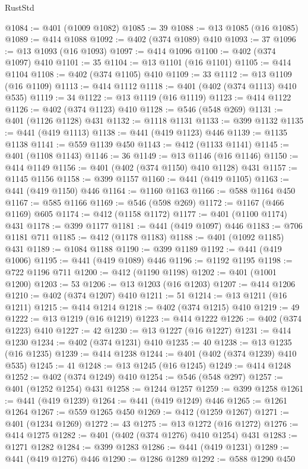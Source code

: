 \begin{lexlean}{RustStd}
\begin{coremodule}
@1084 := @401 (@1009 @1082)
@1085 := 39
@1088 := @13 @1085 (@16 @1085)
@1089 := @414 @1088
@1092 := @402 (@374 @1089) @410
@1093 := 37
@1096 := @13 @1093 (@16 @1093)
@1097 := @414 @1096
@1100 := @402 (@374 @1097) @410
@1101 := 35
@1104 := @13 @1101 (@16 @1101)
@1105 := @414 @1104
@1108 := @402 (@374 @1105) @410
@1109 := 33
@1112 := @13 @1109 (@16 @1109)
@1113 := @414 @1112
@1118 := @401 (@402 (@374 @1113) @410 @535)
@1119 := 34
@1122 := @13 @1119 (@16 @1119)
@1123 := @414 @1122
@1126 := @402 (@374 @1123) @410
@1128 := @546 (@548 @269)
@1131 := @401 (@1126 @1128) @431
@1132 := @1118 @1131
@1133 := @399 @1132
@1135 := @441 (@419 @1113)
@1138 := @441 (@419 @1123) @446
@1139 := @1135 @1138
@1141 := @559 @1139 @450
@1143 := @412 (@1133 @1141)
@1145 := @401 (@1108 @1143)
@1146 := 36
@1149 := @13 @1146 (@16 @1146)
@1150 := @414 @1149
@1156 := @401 (@402 (@374 @1150) @410 @1128) @431
@1157 := @1145 @1156
@1158 := @399 @1157
@1160 := @441 (@419 @1105)
@1163 := @441 (@419 @1150) @446
@1164 := @1160 @1163
@1166 := @588 @1164 @450
@1167 := @585 @1166
@1169 := @546 (@598 @269)
@1172 := @1167 (@466 @1169) @605
@1174 := @412 (@1158 @1172)
@1177 := @401 (@1100 @1174) @431
@1178 := @399 @1177
@1181 := @441 (@419 @1097) @446
@1183 := @706 @1181 @711
@1185 := @412 (@1178 @1183)
@1188 := @401 (@1092 @1185) @431
@1189 := @1084 @1188
@1190 := @399 @1189
@1192 := @441 (@419 @1006)
@1195 := @441 (@419 @1089) @446
@1196 := @1192 @1195
@1198 := @722 @1196 @711
@1200 := @412 (@1190 @1198)
@1202 := @401 (@1001 @1200)
@1203 := 53
@1206 := @13 @1203 (@16 @1203)
@1207 := @414 @1206
@1210 := @402 (@374 @1207) @410
@1211 := 51
@1214 := @13 @1211 (@16 @1211)
@1215 := @414 @1214
@1218 := @402 (@374 @1215) @410
@1219 := 49
@1222 := @13 @1219 (@16 @1219)
@1223 := @414 @1222
@1226 := @402 (@374 @1223) @410
@1227 := 42
@1230 := @13 @1227 (@16 @1227)
@1231 := @414 @1230
@1234 := @402 (@374 @1231) @410
@1235 := 40
@1238 := @13 @1235 (@16 @1235)
@1239 := @414 @1238
@1244 := @401 (@402 (@374 @1239) @410 @535)
@1245 := 41
@1248 := @13 @1245 (@16 @1245)
@1249 := @414 @1248
@1252 := @402 (@374 @1249) @410
@1254 := @546 (@548 @297)
@1257 := @401 (@1252 @1254) @431
@1258 := @1244 @1257
@1259 := @399 @1258
@1261 := @441 (@419 @1239)
@1264 := @441 (@419 @1249) @446
@1265 := @1261 @1264
@1267 := @559 @1265 @450
@1269 := @412 (@1259 @1267)
@1271 := @401 (@1234 @1269)
@1272 := 43
@1275 := @13 @1272 (@16 @1272)
@1276 := @414 @1275
@1282 := @401 (@402 (@374 @1276) @410 @1254) @431
@1283 := @1271 @1282
@1284 := @399 @1283
@1286 := @441 (@419 @1231)
@1289 := @441 (@419 @1276) @446
@1290 := @1286 @1289
@1292 := @588 @1290 @450

\end{coremodule}
\end{lexlean}
